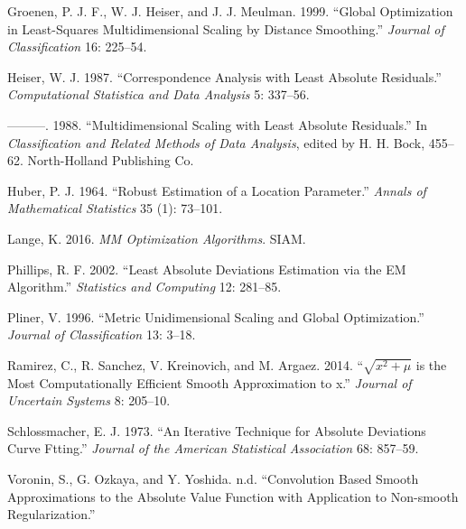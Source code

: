 \documentclass[
  12pt,
  letterpaper,
  DIV=11,
  numbers=noendperiod]{scrartcl}
\newlength{\cslhangindent}
\newenvironment{CSLReferences}[2] %
 {\begin{list}{}{%
  \setlength{\itemindent}{0pt}
  \setlength{\leftmargin}{0pt}
  \setlength{\parsep}{0pt}
  \ifodd #1
   \setlength{\leftmargin}{\cslhangindent}
   \setlength{\itemindent}{-1\cslhangindent}
  \fi
  \setlength{\itemsep}{#2\baselineskip}}}
 {\end{list}}
\begin{document}
\begin{CSLReferences}{1}{0}
Groenen, P. J. F., W. J. Heiser, and J. J. Meulman. 1999. {``{Global
Optimization in Least-Squares Multidimensional Scaling by Distance
Smoothing}.''} \emph{Journal of Classification} 16: 225--54.

Heiser, W. J. 1987. {``{Correspondence Analysis with Least Absolute
Residuals}.''} \emph{Computational Statistica and Data Analysis} 5:
337--56.

---------. 1988. {``{Multidimensional Scaling with Least Absolute
Residuals}.''} In \emph{Classification and Related Methods of Data
Analysis}, edited by H. H. Bock, 455--62. North-Holland Publishing Co.

Huber, P. J. 1964. {``Robust Estimation of a Location Parameter.''}
\emph{Annals of Mathematical Statistics} 35 (1): 73--101.

Lange, K. 2016. \emph{MM Optimization Algorithms}. SIAM.

Phillips, R. F. 2002. {``Least Absolute Deviations Estimation via the EM
Algorithm.''} \emph{Statistics and Computing} 12: 281--85.

Pliner, V. 1996. {``{Metric Unidimensional Scaling and Global
Optimization}.''} \emph{Journal of Classification} 13: 3--18.

Ramirez, C., R. Sanchez, V. Kreinovich, and M. Argaez. 2014.
{``{\(\sqrt{x^2+\mu}\) is the Most Computationally Efficient Smooth
Approximation to \vert{}x\vert{}}.''} \emph{Journal of Uncertain
Systems} 8: 205--10.

Schlossmacher, E. J. 1973. {``An Iterative Technique for Absolute
Deviations Curve Ftting.''} \emph{Journal of the American Statistical
Association} 68: 857--59.

Voronin, S., G. Ozkaya, and Y. Yoshida. n.d. {``{Convolution Based
Smooth Approximations to the Absolute Value Function with Application to
Non-smooth Regularization}.''}

\end{CSLReferences}
\end{document}
